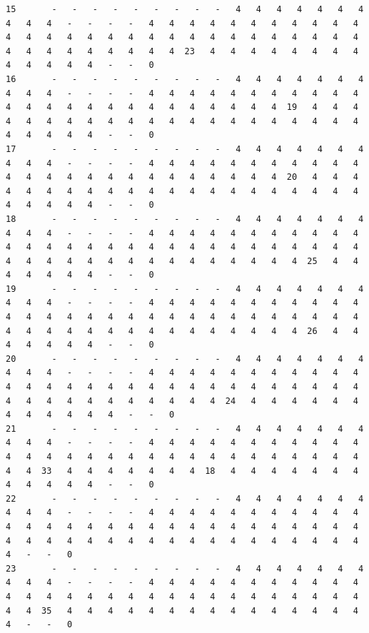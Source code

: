 \documentclass[11pt,a4paper]{article}
\begin{document}
\begin{landscape}
\begin{verbatim}
15       -   -   -   -   -   -   -   -   -   4   4   4   4   4   4   4   4   4   4   -   -   -   -   4   4   4   4   4   4   4   4   4   4   4   4   4   4   4   4   4   4   4   4   4   4   4   4   4   4   4   4   4   4   4   4   4   4   4   4   4   4  23   4   4   4   4   4   4   4   4   4   4   4   4   4   -   -   0
16       -   -   -   -   -   -   -   -   -   4   4   4   4   4   4   4   4   4   4   -   -   -   -   4   4   4   4   4   4   4   4   4   4   4   4   4   4   4   4   4   4   4   4   4   4   4   4   4  19   4   4   4   4   4   4   4   4   4   4   4   4   4   4   4   4   4   4   4   4   4   4   4   4   4   4   -   -   0
17       -   -   -   -   -   -   -   -   -   4   4   4   4   4   4   4   4   4   4   -   -   -   -   4   4   4   4   4   4   4   4   4   4   4   4   4   4   4   4   4   4   4   4   4   4   4   4   4  20   4   4   4   4   4   4   4   4   4   4   4   4   4   4   4   4   4   4   4   4   4   4   4   4   4   4   -   -   0
18       -   -   -   -   -   -   -   -   -   4   4   4   4   4   4   4   4   4   4   -   -   -   -   4   4   4   4   4   4   4   4   4   4   4   4   4   4   4   4   4   4   4   4   4   4   4   4   4   4   4   4   4   4   4   4   4   4   4   4   4   4   4   4   4   4   4   4  25   4   4   4   4   4   4   4   -   -   0
19       -   -   -   -   -   -   -   -   -   4   4   4   4   4   4   4   4   4   4   -   -   -   -   4   4   4   4   4   4   4   4   4   4   4   4   4   4   4   4   4   4   4   4   4   4   4   4   4   4   4   4   4   4   4   4   4   4   4   4   4   4   4   4   4   4   4   4  26   4   4   4   4   4   4   4   -   -   0
20       -   -   -   -   -   -   -   -   -   4   4   4   4   4   4   4   4   4   4   -   -   -   -   4   4   4   4   4   4   4   4   4   4   4   4   4   4   4   4   4   4   4   4   4   4   4   4   4   4   4   4   4   4   4   4   4   4   4   4   4   4   4   4  24   4   4   4   4   4   4   4   4   4   4   4   4   -   -   0
21       -   -   -   -   -   -   -   -   -   4   4   4   4   4   4   4   4   4   4   -   -   -   -   4   4   4   4   4   4   4   4   4   4   4   4   4   4   4   4   4   4   4   4   4   4   4   4   4   4   4   4   4   4   4  33   4   4   4   4   4   4   4  18   4   4   4   4   4   4   4   4   4   4   4   4   -   -   0
22       -   -   -   -   -   -   -   -   -   4   4   4   4   4   4   4   4   4   4   -   -   -   -   4   4   4   4   4   4   4   4   4   4   4   4   4   4   4   4   4   4   4   4   4   4   4   4   4   4   4   4   4   4   4   4   4   4   4   4   4   4   4   4   4   4   4   4   4   4   4   4   -   -   0
23       -   -   -   -   -   -   -   -   -   4   4   4   4   4   4   4   4   4   4   -   -   -   -   4   4   4   4   4   4   4   4   4   4   4   4   4   4   4   4   4   4   4   4   4   4   4   4   4   4   4   4   4   4   4  35   4   4   4   4   4   4   4   4   4   4   4   4   4   4   4   4   -   -   0

\end{verbatim}
\end{landscape}
\end{document}
